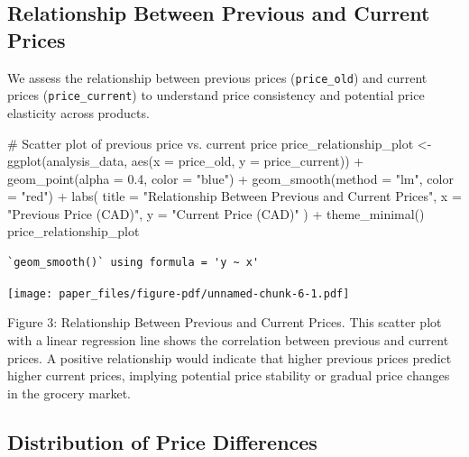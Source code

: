 \documentclass[
  letterpaper,
  DIV=11,
  numbers=noendperiod]{scrartcl}
\newenvironment{Shaded}{\begin{snugshade}}{\end{snugshade}}
\newcommand{\AttributeTok}[1]{\textcolor[rgb]{0.40,0.45,0.13}{#1}}
\newcommand{\CommentTok}[1]{\textcolor[rgb]{0.37,0.37,0.37}{#1}}
\newcommand{\FloatTok}[1]{\textcolor[rgb]{0.68,0.00,0.00}{#1}}
\newcommand{\FunctionTok}[1]{\textcolor[rgb]{0.28,0.35,0.67}{#1}}
\newcommand{\NormalTok}[1]{\textcolor[rgb]{0.00,0.23,0.31}{#1}}
\newcommand{\OtherTok}[1]{\textcolor[rgb]{0.00,0.23,0.31}{#1}}
\newcommand{\SpecialCharTok}[1]{\textcolor[rgb]{0.37,0.37,0.37}{#1}}
\newcommand{\StringTok}[1]{\textcolor[rgb]{0.13,0.47,0.30}{#1}}
\begin{document}
\subsection{Relationship Between Previous and Current
Prices}\label{relationship-between-previous-and-current-prices}

We assess the relationship between previous prices (\texttt{price\_old})
and current prices (\texttt{price\_current}) to understand price
consistency and potential price elasticity across products.

\begin{Shaded}
\begin{Highlighting}[]
\CommentTok{\# Scatter plot of previous price vs. current price}
\NormalTok{price\_relationship\_plot }\OtherTok{\textless{}{-}} \FunctionTok{ggplot}\NormalTok{(analysis\_data, }\FunctionTok{aes}\NormalTok{(}\AttributeTok{x =}\NormalTok{ price\_old, }\AttributeTok{y =}\NormalTok{ price\_current)) }\SpecialCharTok{+}
  \FunctionTok{geom\_point}\NormalTok{(}\AttributeTok{alpha =} \FloatTok{0.4}\NormalTok{, }\AttributeTok{color =} \StringTok{"blue"}\NormalTok{) }\SpecialCharTok{+}
  \FunctionTok{geom\_smooth}\NormalTok{(}\AttributeTok{method =} \StringTok{"lm"}\NormalTok{, }\AttributeTok{color =} \StringTok{"red"}\NormalTok{) }\SpecialCharTok{+}
  \FunctionTok{labs}\NormalTok{(}
    \AttributeTok{title =} \StringTok{"Relationship Between Previous and Current Prices"}\NormalTok{,}
    \AttributeTok{x =} \StringTok{"Previous Price (CAD)"}\NormalTok{,}
    \AttributeTok{y =} \StringTok{"Current Price (CAD)"}
\NormalTok{  ) }\SpecialCharTok{+}
  \FunctionTok{theme\_minimal}\NormalTok{()}
\NormalTok{price\_relationship\_plot}
\end{Highlighting}
\end{Shaded}

\begin{verbatim}
`geom_smooth()` using formula = 'y ~ x'
\end{verbatim}

\texttt{[image: paper\_files/figure-pdf/unnamed-chunk-6-1.pdf]}

Figure 3: Relationship Between Previous and Current Prices. This scatter
plot with a linear regression line shows the correlation between
previous and current prices. A positive relationship would indicate that
higher previous prices predict higher current prices, implying potential
price stability or gradual price changes in the grocery market.

\subsection{Distribution of Price
Differences}\label{distribution-of-price-differences}
\end{document}
